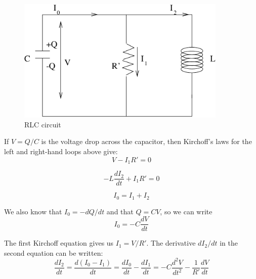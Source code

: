 \documentclass[makesolutionspdf]{esg8022pset}
\begin{document}
\begin{solution}
  \begin{figure}[H]
    \centering
    \includegraphics[width = 10cm]{ps8}
    \caption{RLC circuit}
    \label{fig:graph22.eps}
  \end{figure}

  If $V=Q/C$ is the voltage drop across the capacitor, then Kirchoff's
  laws for the left and right-hand loops above give:
  \begin{equation}
  V-I_1R'=0
  \end{equation}

  \begin{equation}
  -L\frac{dI_2}{dt}+I_1R'=0
  \end{equation}

  \begin{equation}
  I_0=I_1+I_2
  \end{equation}

  We also know that $I_0=-dQ/dt$ and that $Q=CV$, so we can write
  \begin{equation}
  I_0=-C\frac{dV}{dt}
  \end{equation}

  The first Kirchoff equation gives us $I_1=V/R'$. The derivative
  $dI_2/dt$ in the second equation can be written:
  \begin{equation}
  \frac{dI_2}{dt}=\frac{d(I_0-I_1)}{dt}=\frac{dI_0}{dt}-\frac{dI_1}{dt}=-C\frac{d^2V}{dt^2}-\frac{1}{R'}\frac{dV}{dt}
  \end{equation}


\end{solution}
\end{document}
